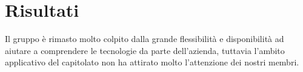 \section{Risultati}
Il gruppo è rimasto molto colpito dalla grande flessibilità e disponibilità ad aiutare a comprendere le tecnologie da parte dell'azienda, tuttavia l'ambito applicativo del capitolato non ha attirato molto l'attenzione dei nostri membri.